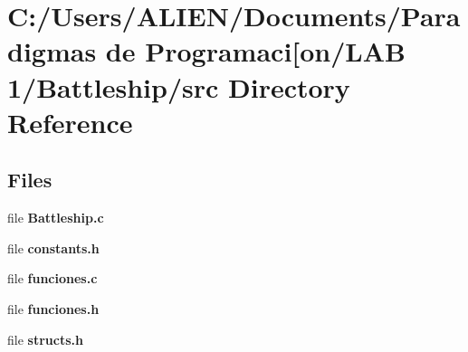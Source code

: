 \section{C\+:/\+Users/\+A\+L\+I\+E\+N/\+Documents/\+Paradigmas de Programaci[on/\+L\+AB 1/\+Battleship/src Directory Reference}
\label{dir_38f287064d790f4f2d1c11d0bd542454}\index{C\+:/\+Users/\+A\+L\+I\+E\+N/\+Documents/\+Paradigmas de Programaci[on/\+L\+A\+B 1/\+Battleship/src Directory Reference@{C\+:/\+Users/\+A\+L\+I\+E\+N/\+Documents/\+Paradigmas de Programaci[on/\+L\+A\+B 1/\+Battleship/src Directory Reference}}
\subsection*{Files}
\begin{DoxyCompactItemize}
\item 
file {\bf Battleship.\+c}
\item 
file {\bf constants.\+h}
\item 
file {\bf funciones.\+c}
\item 
file {\bf funciones.\+h}
\item 
file {\bf structs.\+h}
\end{DoxyCompactItemize}
